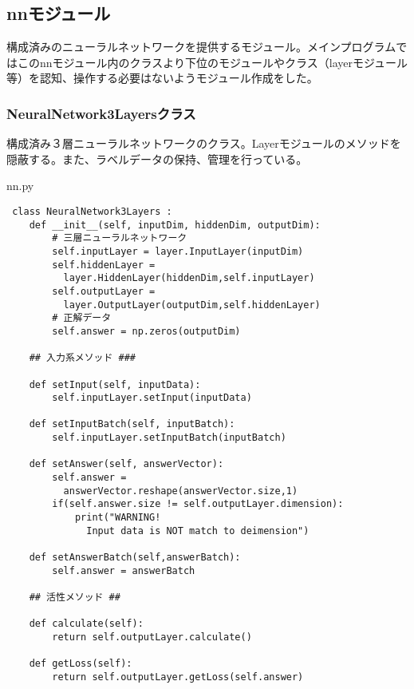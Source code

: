 \documentclass{ujarticle} %
\begin{document}
\subsection{nnモジュール}
構成済みのニューラルネットワークを提供するモジュール。メインプログラムではこのnnモジュール内のクラスより下位のモジュールやクラス（layerモジュール等）を認知、操作する必要はないようモジュール作成をした。

\subsubsection{NeuralNetwork3Layersクラス}
構成済み３層ニューラルネットワークのクラス。Layerモジュールのメソッドを隠蔽する。また、ラベルデータの保持、管理を行っている。

\begin{itembox}[l]{nn.py}
  \begin{verbatim}
 class NeuralNetwork3Layers :
    def __init__(self, inputDim, hiddenDim, outputDim):
        # 三層ニューラルネットワーク
        self.inputLayer = layer.InputLayer(inputDim)
        self.hiddenLayer =
          layer.HiddenLayer(hiddenDim,self.inputLayer)
        self.outputLayer =
          layer.OutputLayer(outputDim,self.hiddenLayer)
        # 正解データ
        self.answer = np.zeros(outputDim)

    ## 入力系メソッド ###

    def setInput(self, inputData):
        self.inputLayer.setInput(inputData)

    def setInputBatch(self, inputBatch):
        self.inputLayer.setInputBatch(inputBatch)

    def setAnswer(self, answerVector):
        self.answer =
          answerVector.reshape(answerVector.size,1)
        if(self.answer.size != self.outputLayer.dimension):
            print("WARNING!
              Input data is NOT match to deimension")

    def setAnswerBatch(self,answerBatch):
        self.answer = answerBatch

    ## 活性メソッド ##

    def calculate(self):
        return self.outputLayer.calculate()

    def getLoss(self):
        return self.outputLayer.getLoss(self.answer)
  \end{verbatim}
\end{itembox}
\end{document}

